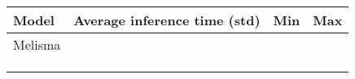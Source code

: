 \begin{tabular}{l|lll}
    Model & Average inference time (std) & Min & Max \\
    \hline
    Melisma & & & \\
    \textcite{chen2021attend} & & & \\
    \textcite{mcleod2021modular} & & & \\
    \textcite{micchi2020not} & & & \\
\end{tabular}
